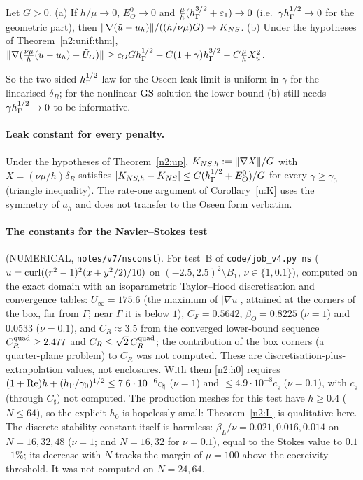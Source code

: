 \begin{corollary}\label{n2:gen}
Let $G>0$. (a) If $h/\mu\to0$, $E^0_O\to0$ and $\frac\mu h(h_\Gamma^{3/2}+\varepsilon_1)\to0$ (i.e.\ $\gamma h_\Gamma^{1/2}\to0$ for the geometric part), then $\lVert \nabla(\tilde u-u_h)\rVert/((h/\nu\mu)G)\to K_{NS}$. (b) Under the hypotheses of Theorem~\ref{n2:unif:thm}, $\lVert \nabla(\frac{\nu\mu}h(\tilde u-u_h)-\tilde U_O)\rVert\ge c_OGh_\Gamma^{1/2}-C(1+\gamma)h_\Gamma^{3/2}-C\frac\mu hX_u^2$.
\end{corollary}

So the two-sided $h_\Gamma^{1/2}$ law for the Oseen leak limit is uniform in $\gamma$ for the linearised $\delta_R$; for the nonlinear $\mathrm{GS}$ solution the lower bound (b) still needs $\gamma h_\Gamma^{1/2}\to0$ to be informative.

\paragraph{Leak constant for every penalty.} Under the hypotheses of Theorem~\ref{n2:up}, $K_{NS,h}:=\lVert \nabla X\rVert/G$ with $X=(\nu\mu/h)\delta_R$ satisfies $|K_{NS,h}-K_{NS}|\le C(h_\Gamma^{1/2}+E^0_O)/G$ for every $\gamma\ge\gamma_0$ (triangle inequality). The rate-one argument of Corollary~\ref{u:K} uses the symmetry of $a_h$ and does not transfer to the Oseen form verbatim.

\paragraph{The constants for the Navier--Stokes test} (NUMERICAL, \texttt{notes/v7/nsconst}). For test~B of \texttt{code/job\_v4.py ns} ($u=\operatorname{curl}((r^2-1)^2(x+y^2/2)/10)$ on $(-2.5,2.5)^2\setminus\overline{B_1}$, $\nu\in\{1,0.1\}$), computed on the exact domain with an isoparametric Taylor--Hood discretisation and convergence tables: $U_\infty=175.6$ (the maximum of $|\nabla u|$, attained at the corners of the box, far from $\Gamma$; near $\Gamma$ it is below $1$), $C_F=0.5642$, $\beta_O=0.8225$ ($\nu=1$) and $0.0533$ ($\nu=0.1$), and $C_R\approx3.5$ from the converged lower-bound sequence $C_R^{\rm quad}\ge2.477$ and $C_R\le\sqrt2\,C_R^{\rm quad}$; the contribution of the box corners (a quarter-plane problem) to $C_R$ was not computed. These are discretisation-plus-extrapolation values, not enclosures. With them \eqref{n2:h0} requires $(1+\mathrm{Re})h+(h_\Gamma/\gamma_0)^{1/2}\le7.6\cdot10^{-6}c_\natural$ ($\nu=1$) and $\le4.9\cdot10^{-8}c_\natural$ ($\nu=0.1$), with $c_\natural$ (through $C_\sharp$) not computed. The production meshes for this test have $h\ge0.4$ ($N\le64$), so the explicit $h_0$ is hopelessly small: Theorem~\ref{n2:L} is qualitative here. The discrete stability constant itself is harmless: $\beta_L/\nu=0.021,0.016,0.014$ on $N=16,32,48$ ($\nu=1$; and $N=16,32$ for $\nu=0.1$), equal to the Stokes value to $0.1$--$1\%$; its decrease with $N$ tracks the margin of $\mu=100$ above the coercivity threshold. It was not computed on $N=24,64$.

